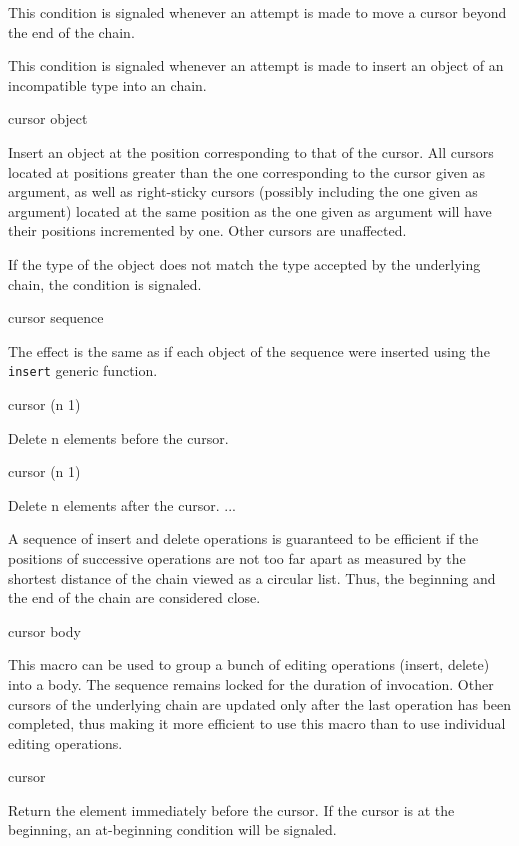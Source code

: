 \documentclass[11pt]{article}
\begin{document}

This condition is signaled whenever an attempt is made to move a
cursor beyond the end of the chain. 


This condition is signaled whenever an attempt is made to insert an
object of an incompatible type into an chain. 

 {cursor object}

Insert an object at the position corresponding to that of the cursor. 
All cursors located at positions greater than the one corresponding to
the cursor given as argument, as well as right-sticky cursors (possibly
including the one given as argument)  located at the same position as
the one given as argument will have their positions incremented by
one. Other cursors are unaffected. 

If the type of the object does not match the type accepted by the
underlying chain, the  condition is
signaled.

 {cursor sequence}

The effect is the same as if each object of the sequence were
inserted using the \texttt{insert} generic function. 

 {cursor \optional (n 1)}

Delete n elements before the cursor.

 {cursor \optional (n 1)}

Delete n elements after the cursor.  ...

A sequence of insert and delete operations is guaranteed to be
efficient if the positions of successive operations are not too far
apart as measured by the shortest distance of the chain viewed as a
circular list.  Thus, the beginning and the end of the chain are
considered close.

 {cursor \body body}

This macro can be used to group a bunch of editing operations (insert,
delete) into a body.  The sequence remains locked for the duration of
invocation.  Other cursors of the underlying chain are updated only
after the last operation has been completed, thus making it more
efficient to use this macro than to use individual editing operations.

 {cursor}

Return the element immediately before the cursor.  If the cursor is
at the beginning, an at-beginning condition will be signaled. 
\end{document}
